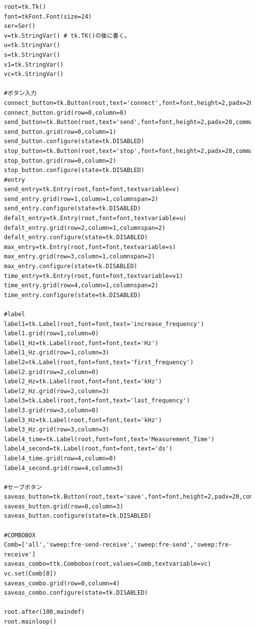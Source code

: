 \documentclass[12pt]{jarticle}
\begin{document}
\begin{lstlisting}[caption = GUIプログラム , label = program1]
root=tk.Tk()
font=tkFont.Font(size=24)
ser=Ser() 
v=tk.StringVar() # tk.TK()の後に書く。
u=tk.StringVar()
s=tk.StringVar()
v1=tk.StringVar()
vc=tk.StringVar()

#ボタン入力
connect_button=tk.Button(root,text='connect',font=font,height=2,padx=20,command=ser.connect)
connect_button.grid(row=0,column=0)
send_button=tk.Button(root,text='send',font=font,height=2,padx=20,command=ser.send_com)
send_button.grid(row=0,column=1)
send_button.configure(state=tk.DISABLED)
stop_button=tk.Button(root,text='stop',font=font,height=2,padx=20,command=ser.stop_com)
stop_button.grid(row=0,column=2)
stop_button.configure(state=tk.DISABLED)
#entry
send_entry=tk.Entry(root,font=font,textvariable=v)
send_entry.grid(row=1,column=1,columnspan=2)
send_entry.configure(state=tk.DISABLED)
defalt_entry=tk.Entry(root,font=font,textvariable=u)
defalt_entry.grid(row=2,column=1,columnspan=2)
defalt_entry.configure(state=tk.DISABLED)
max_entry=tk.Entry(root,font=font,textvariable=s)
max_entry.grid(row=3,column=1,columnspan=2)
max_entry.configure(state=tk.DISABLED)
time_entry=tk.Entry(root,font=font,textvariable=v1)
time_entry.grid(row=4,column=1,columnspan=2)
time_entry.configure(state=tk.DISABLED)

#label
label1=tk.Label(root,font=font,text='increase_frequency')
label1.grid(row=1,column=0)
label1_Hz=tk.Label(root,font=font,text='Hz')
label1_Hz.grid(row=1,column=3)
label2=tk.Label(root,font=font,text='first_frequency')
label2.grid(row=2,column=0)
label2_Hz=tk.Label(root,font=font,text='kHz')
label2_Hz.grid(row=2,column=3)
label3=tk.Label(root,font=font,text='last_frequency')
label3.grid(row=3,column=0)
label3_Hz=tk.Label(root,font=font,text='kHz')
label3_Hz.grid(row=3,column=3)
label4_time=tk.Label(root,font=font,text='Measurement_Time')
label4_second=tk.Label(root,font=font,text='ds')
label4_time.grid(row=4,column=0)
label4_second.grid(row=4,column=3)

#セーブボタン
saveas_button=tk.Button(root,text='save',font=font,height=2,padx=20,command=saveas)
saveas_button.grid(row=0,column=3)
saveas_button.configure(state=tk.DISABLED)

#COMBOBOX
Comb=['all','sweep:fre-send-receive','sweep:fre-send','sweep:fre-receive']
saveas_combo=ttk.Combobox(root,values=Comb,textvariable=vc)
vc.set(Comb[0])
saveas_combo.grid(row=0,column=4)
saveas_combo.configure(state=tk.DISABLED)

root.after(100,maindef)
root.mainloop()   
	\end{lstlisting}
\end{document}
